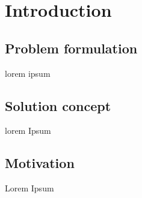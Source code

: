 \section{Introduction}

\subsection{Problem formulation}
\par lorem ipsum

\subsection{Solution concept}
\par lorem Ipsum

\subsection{Motivation}
\par Lorem Ipsum


\clearpage